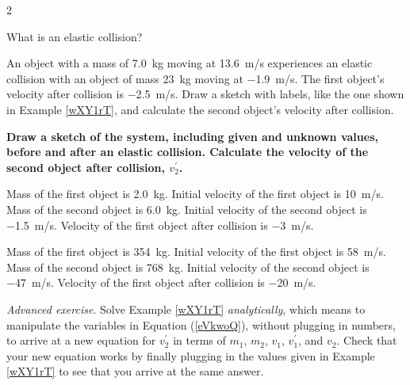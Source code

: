 \documentclass{article}
\numberwithin{equation}{section}
\numberwithin{figure}{section}
\begin{document}
\begin{multicols*}{2}

\begin{exercise} \label{rhrGbz}
    What is an elastic collision?
\end{exercise}


\begin{exercise}\label{bTj1d8} %
An object with a mass of \SI{7.0}{kg} moving at \SI{13.6}{m/s} experiences an elastic collision with an object of mass \SI{23}{kg} moving at \SI{-1.9}{m/s}. The first object's velocity after collision is \SI{-2.5}{m/s}. Draw a sketch with labels, like the one shown in Example \ref{wXY1rT}, and calculate the second object's velocity after collision.
\end{exercise}

\cyanhrule

\textbf{Draw a sketch of the system, including given and unknown values, before and after an elastic collision. Calculate the velocity of the second object after collision, $v_2^{\prime}$.}

\begin{exercise} \label{O4Og7L} %
    Mass of the first object is \SI{2.0}{kg}.
    Initial velocity of the first object is \SI{10}{m/s}. 
    Mass of the second object is \SI{6.0}{kg}. 
    Initial velocity of the second object is \SI{-1.5}{m/s}. 
    Velocity of the first object after collision is \SI{-3}{m/s}.
\end{exercise}

\begin{exercise} \label{6yR4Xo} %
    Mass of the first object is \SI{354}{kg}.
    Initial velocity of the first object is \SI{58}{m/s}. 
    Mass of the second object is \SI{768}{kg}. 
    Initial velocity of the second object is \SI{-47}{m/s}. 
    Velocity of the first object after collision is \SI{-20}{m/s}.
\end{exercise}

\cyanhrule

\begin{exercise} \label{jhvCZ1}
\textit{Advanced exercise}. Solve Example \ref{wXY1rT} \textit{analytically}, which means to manipulate the variables in Equation (\ref{eVkwoQ}), without plugging in numbers, to arrive at a new equation for $v_2^{\prime}$ in terms of $m_1$, $m_2$, $v_1$, $v_1^{\prime}$, and $v_2$. Check that your new equation works by finally plugging in the values given in Example \ref{wXY1rT} to see that you arrive at the same answer.
\end{exercise}


\end{multicols*}
\end{document}
